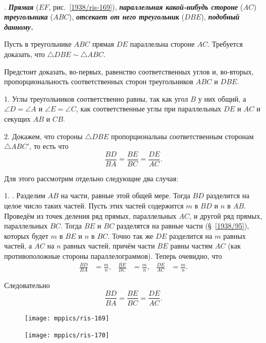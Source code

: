 \documentclass[oneside]{book}
\begin{document}
\paragraph{}\label{1938/159}
.
\textbf{\emph{Прямая}} ($EF$, рис.~\ref{1938/ris-169}), \textbf{\emph{параллельная какой-нибудь стороне}} ($AC$) \textbf{\emph{треугольника}} ($ABC$), \textbf{\emph{отсекает от него треугольник}} ($DBE$), \textbf{\emph{подобный данному.}}

Пусть в треугольнике $ABC$ прямая $DE$ параллельна стороне $AC$.
Требуется доказать, что $\triangle DBE\sim \triangle ABC$.

Предстоит доказать, во-первых, равенство соответственных углов и, во-вторых, пропорциональность соответственных сторон треугольников $ABC$ и $DBE$.

1.
Углы треугольников соответственно равны, так как угол $B$ у них общий, а $\angle D = \angle A$ и $\angle E= \angle C$, как соответственные углы при параллельных $DE$ и $AC$ и секущих $AB$ и $CB$.

2.
Докажем, что стороны $\triangle DBE$ пропорциональны соответственным сторонам $\triangle ABC'$, то есть что
\[\frac{BD}{BA}=\frac{BE}{BC}=\frac{DE}{AC}.\]

Для этого рассмотрим отдельно следующие два случая:

1.
.
Разделим $AB$ на части, равные этой общей мере.
Тогда $BD$ разделится на целое число таких частей.
Пусть этих частей содержится $m$ в $BD$ и $n$ в $AB$.
Проведём из точек деления ряд прямых, параллельных $AC$, и другой ряд прямых, параллельных $BC$.
Тогда $BE$ и $BC$ разделятся на равные части (§~\ref{1938/95}), которых будет $m$ в $BE$ и $n$ в $BC$.
Точно так же $DE$ разделится на $m$ равных частей, а $AC$ на $n$ равных частей, причём части $BE$ равны частям $AC$ (как противоположные стороны параллелограммов).
Теперь очевидно, что
\begin{align*}
\frac{BD}{BA}&=\frac mn,
&
\frac{BE}{BC}&=\frac mn,
&
\frac{DE}{AC}&=\frac mn.
\end{align*}

Следовательно
\[\frac{BD}{BA}=\frac{BE}{BC}=\frac{DE}{AC}.\]

\begin{figure}[h!]
\begin{minipage}{.48\textwidth}
\centering
\texttt{[image: mppics/ris-169]}
\caption{}\label{1938/ris-169}
\end{minipage}
\hfill
\begin{minipage}{.48\textwidth}
\centering
\texttt{[image: mppics/ris-170]}
\caption{}\label{1938/ris-170}
\end{minipage}
\end{figure}
\end{document}
